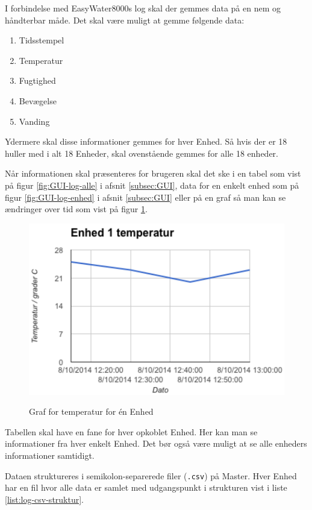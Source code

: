 
I forbindelse med EasyWater8000s log skal der gemmes data på en nem og håndterbar måde. Det skal være muligt at gemme følgende data:

\begin{enumerate}
	\item Tidsstempel
	\item Temperatur
	\item Fugtighed
	\item Bevægelse
	\item Vanding
\end{enumerate}

Ydermere skal disse informationer gemmes for hver Enhed. Så hvis der er 18 huller med i alt 18 Enheder, skal ovenstående gemmes for alle 18 enheder.

Når informationen skal præsenteres for brugeren skal det ske i en tabel som vist på figur \ref{fig:GUI-log-alle} i afsnit \ref{subsec:GUI}, data for en enkelt enhed som på figur \ref{fig:GUI-log-enhed} i afsnit \ref{subsec:GUI} eller på en graf så man kan se ændringer over tid som vist på figur \ref{fig:log-graf}.

\begin{figure}[htbp] \centering
{\includegraphics[scale=0.5]{filer/pics/SW-Log-graf}}
\caption{Graf for temperatur for én Enhed}
\label{fig:log-graf}
\end{figure}

Tabellen skal have en fane for hver opkoblet Enhed. Her kan man se informationer fra hver enkelt Enhed. Det bør også være muligt at se alle enheders informationer samtidigt.

Dataen struktureres i semikolon-separerede filer (\verb+.csv+) på Master. Hver Enhed har en fil hvor alle data er samlet med udgangspunkt i strukturen vist i liste \ref{list:log-csv-struktur}.

